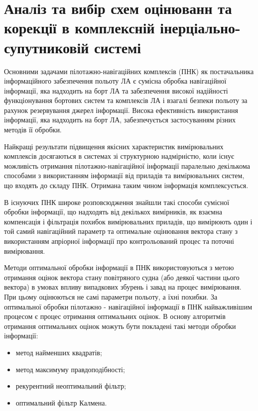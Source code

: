 \section{Аналіз та вибір схем оцінюванн та корекції в комплексній інерціально-супутниковій системі}

Основними задачами пілотажно-навігаційних комплексів (ПНК) як постачальника 
інформаційного забезпечення польоту ЛА є сумісна обробка навігаційної інформації, 
яка надходить на борт ЛА та забезпечення високої надійності функціонування бортових 
систем та комплексів ЛА і взагалі безпеки польоту за рахунок резервування 
джерел інформації. Висока ефективність використання інформації, яка 
надходить на борт ЛА, забезпечується застосуванням різних методів її обробки. 

Найкращі результати підвищення якісних характеристик вимірювальних комплексів 
досягаються  в системах зі структурною надмірністю, коли існує можливість 
отримання пілотажно-навігаційної інформації паралельно декількома способами з 
використанням інформації від приладів та вимірювальних систем, що входять до 
складу ПНК. Отримана таким чином інформація комплексується.

В існуючих ПНК широке розповсюдження знайшли такі способи сумісної обробки 
інформації, що надходять від декількох вимірників, як взаємна компенсація і 
фільтрація похибок вимірювальних приладів, що вимірюють один і той самий 
навігаційний параметр та оптимальне оцінювання вектора стану з використанням 
апріорної інформації про контрольований процес та поточні вимірювання.

Методи оптимальної обробки інформації в ПНК використовуються з метою 
отримання оцінок вектора стану повітряного судна (або деякої частини 
цього вектора) в умовах впливу випадкових збурень і завад на процес 
вимірювання. При цьому оцінюються не самі параметри польоту, а їхні похибки. 
За оптимальної обробки пілотажно - навігаційної інформації в ПНК найважливішим 
процесом є процес отримання оптимальних оцінок. В основу алгоритмів отримання 
оптимальних оцінок можуть бути покладені такі методи обробки інформації:
\begin{itemize}
 \item метод найменших квадратів;
 \item метод максимуму правдоподібності;
 \item рекурентний неоптимальний фільтр;
 \item оптимальний фільтр Калмена.
\end{itemize}




